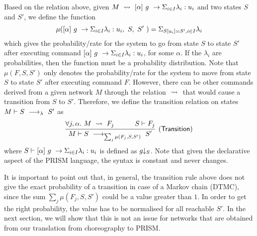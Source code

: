 Based on the relation above, given
$M\ \stackrel{}{\rightsquigarrow}\ [\alpha]\ g\ \rightarrow \Sigma_{i\in I}\lambda_i: u_i$ and two
states $S$ and $S'$, we define the function
$$\mu([\alpha]\ g\ \rightarrow \Sigma_{i\in I}\lambda_i: u_i,\ S,\ S'\ ) = \Sigma_{S[u_i]=S',i\in I}\lambda_i$$
which gives the probability/rate for the system to go from state $S$
to state $S'$ after executing command $[\alpha]\ g\ \rightarrow \Sigma_{i\in I}\lambda_i: u_i$,
for some $\alpha$.
%
If the $\lambda_i$ are probabilities, then the function must be a
probability distribution. Note that $\mu(F,S,S')$ only denotes the
probability/rate for the system to move from state $S$ to state $S'$
after executing command $F$. However, there can be other commands
derived from a given network $M$ through the relation $\ \stackrel{}{\rightsquigarrow}\ $
that would cause a transition from $S$ to $S'$. Therefore, we define
the transition relation on states $M\vdash S\ \longrightarrow_{\lambda}\ S'$ as
$$
\infer[\mathsf{(Transition)}]
{
  M\vdash S\red{\sum_{j} \mu(F_j,S,S')}S'
}
{
  \forall j,\alpha.\ M\prismred{}F_j
  \quad&\quad
  S\vdash F_j
}
$$
where $S\vdash [\alpha]\ g\ \rightarrow \Sigma_{i\in I}\lambda_i: u_i$ is defined as $g\!\!\downarrow_{S}$.
Note that given the declarative aspect of the PRISM language, the
syntax is constant and never changes.

It is important to point out that, in general, the transition rule
above does not give the exact probability of a transition in case of a
Markov chain (DTMC), since the sum ${\sum_{j} \mu(F_j,S,S')}$ could be
a value greater than $1$. In order to get the right probability, the
value has to be normalised for all reachable $S'$. In the next
section, we will show that this is not an issue for networks that are
obtained from our translation from choreography to PRISM.


